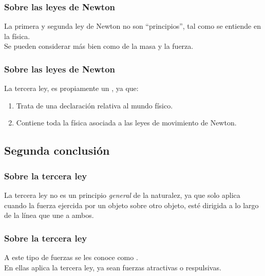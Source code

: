 \documentclass[12pt]{beamer}
\begin{document}
\begin{frame}
\frametitle{Sobre las leyes de Newton}
La primera y segunda ley de Newton no son \enquote{principios}, tal como se entiende en la física.
\\
\bigskip
\pause
Se pueden considerar más bien como  de la masa y la fuerza.
\end{frame}
\begin{frame}
\frametitle{Sobre las leyes de Newton}
La tercera ley, es propiamente un , ya que:
\pause
{}
\begin{enumerate}[<+->]
\item Trata de una declaración relativa al mundo físico.
\item Contiene toda la física asociada a las leyes de movimiento de Newton.
\end{enumerate}
\end{frame}

\subsection{Segunda conclusión}

\begin{frame}
\frametitle{Sobre la tercera ley}
La tercera ley no es un principio \emph{general} de la naturalez, ya que solo aplica cuando la fuerza ejercida por un objeto sobre otro objeto, esté dirigida a lo largo de la línea que une a ambos.
\end{frame}
\begin{frame}
\frametitle{Sobre la tercera ley}
A este tipo de fuerzas se les conoce como .
\\
\bigskip
\pause
En ellas aplica la tercera ley, ya sean fuerzas atractivas o respulsivas.
\end{frame}
\end{document}
